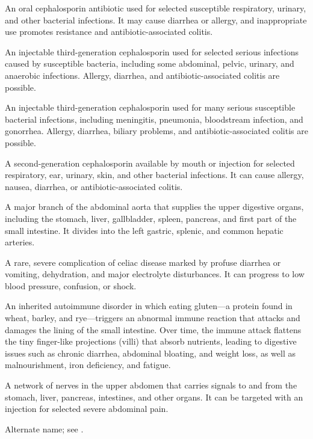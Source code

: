  An oral cephalosporin antibiotic used for selected susceptible respiratory, urinary, and other bacterial infections. It may cause diarrhea or allergy, and inappropriate use promotes resistance and antibiotic-associated colitis.

 An injectable third-generation cephalosporin used for selected serious infections caused by susceptible bacteria, including some abdominal, pelvic, urinary, and anaerobic infections. Allergy, diarrhea, and antibiotic-associated colitis are possible.

 An injectable third-generation cephalosporin used for many serious susceptible bacterial infections, including meningitis, pneumonia, bloodstream infection, and gonorrhea. Allergy, diarrhea, biliary problems, and antibiotic-associated colitis are possible.

 A second-generation cephalosporin available by mouth or injection for selected respiratory, ear, urinary, skin, and other bacterial infections. It can cause allergy, nausea, diarrhea, or antibiotic-associated colitis.

 A major branch of the abdominal aorta that supplies the upper digestive organs, including the stomach, liver, gallbladder, spleen, pancreas, and first part of the small intestine. It divides into the left gastric, splenic, and common hepatic arteries.

 A rare, severe complication of celiac disease marked by profuse diarrhea or vomiting, dehydration, and major electrolyte disturbances. It can progress to low blood pressure, confusion, or shock.

 An inherited autoimmune disorder in which eating gluten---a protein found in wheat, barley, and rye---triggers an abnormal immune reaction that attacks and damages the lining of the small intestine. Over time, the immune attack flattens the tiny finger-like projections (villi) that absorb nutrients, leading to digestive issues such as chronic diarrhea, abdominal bloating, and weight loss, as well as malnourishment, iron deficiency, and fatigue.

 A network of nerves in the upper abdomen that carries signals to and from the stomach, liver, pancreas, intestines, and other organs. It can be targeted with an injection for selected severe abdominal pain.

 Alternate name; see .

